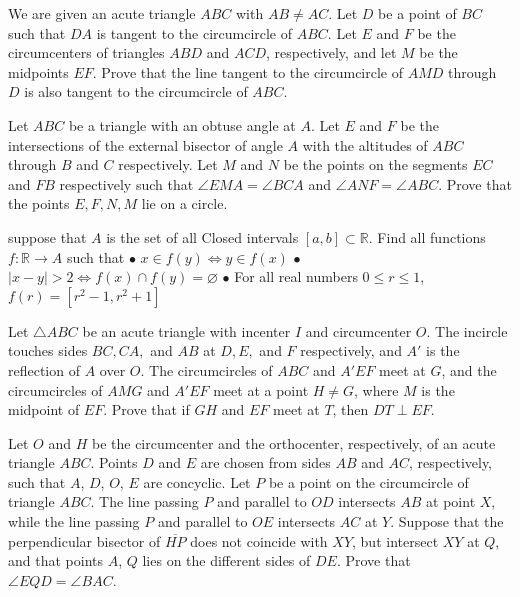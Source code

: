 \documentclass[11pt]{scrartcl}
\begin{document}
\begin{problem}[453148723429253]
	We are given an acute triangle $ABC$ with $AB\neq AC$. Let $D$ be a point of $BC$ such that $DA$ is tangent to the circumcircle of $ABC$. Let $E$ and $F$ be the circumcenters of triangles $ABD$ and $ACD$, respectively, and let $M$ be the midpoints $EF$. Prove that the line tangent to the circumcircle of $AMD$ through $D$ is also tangent to the circumcircle of $ABC$.
\end{problem}
\begin{problem}[453277275848272]
	Let $ABC$ be a triangle with an obtuse angle at $A$. Let $E$ and $F$ be the intersections of the external bisector of angle $A$ with the altitudes of $ABC$ through $B$ and $C$ respectively. Let $M$ and $N$ be the points on the segments $EC$ and $FB$ respectively such that $\angle EMA = \angle BCA$ and $\angle ANF = \angle ABC$. Prove that the points $E, F, N, M$ lie on a circle.
\end{problem}
\begin{problem}[453739862234362]
suppose that $A$ is the set of all Closed intervals $[a,b] \subset \mathbb{R}$. Find all functions $f:\mathbb{R} \rightarrow A$ such that
$\bullet$ $x \in f(y) \Leftrightarrow y \in f(x)$
$\bullet$ $|x-y|>2 \Leftrightarrow f(x) \cap f(y)=\varnothing$
$\bullet$ For all real numbers $0\leq r\leq 1$, $f(r)=[r^2-1,r^2+1]$
\end{problem}
\begin{problem}[456772085666528]
Let $\triangle ABC$ be an acute triangle with incenter $I$ and circumcenter $O$. The incircle touches sides $BC,CA,$ and $AB$ at $D,E,$ and $F$ respectively, and $A'$ is the reflection of $A$ over $O$. The circumcircles of $ABC$ and $A'EF$ meet at $G$, and the circumcircles of $AMG$ and $A'EF$ meet at a point $H\neq G$, where $M$ is the midpoint of $EF$. Prove that if $GH$ and $EF$ meet at $T$, then $DT\perp EF$.
\end{problem}
\begin{problem}[457324036151847]
Let $O$ and $H$ be the circumcenter and the orthocenter, respectively, of an acute triangle $ABC$. Points $D$ and $E$ are chosen from sides $AB$ and $AC$, respectively, such that $A$, $D$, $O$, $E$ are concyclic. Let $P$ be a point on the circumcircle of triangle $ABC$. The line passing $P$ and parallel to $OD$ intersects $AB$ at point $X$, while the line passing $P$ and parallel to $OE$ intersects $AC$ at $Y$. Suppose that the perpendicular bisector of $\overline{HP}$ does not coincide with $XY$, but intersect $XY$ at $Q$, and that points $A$, $Q$ lies on the different sides of $DE$. Prove that $\angle EQD = \angle BAC$.
\end{problem}
\end{document}

